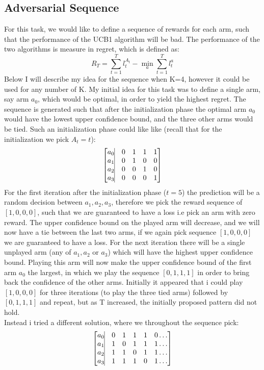 \documentclass{article}
\begin{document}
\subsection{Adversarial Sequence}
For this task, we would like to define a sequence of rewards for each arm, such that the performance of the UCB1 algorithm will be bad. The performance of the two algorithms is measure in regret, which is defined as:
\begin{equation}
R_T = \sum\limits_{t=1}^T l_t^{A_t} - \min_{a} \sum\limits_{t=1}^T l_t^{a}
\end{equation}
Below I will describe my idea for the sequence when K=4, however it could be used for any number of K. My initial idea for this task was to define a single arm, say arm $a_0$, which would be optimal, in order to yield the highest regret. The sequence is generated such that after the initialization phase the optimal arm $a_0$ would have the lowest upper confidence bound, and the three other arms would be tied. Such an initialization phase could like like (recall that for the initialization we pick $A_t = t$):
$$
\begin{bmatrix}
a_0 \vline &  0 & 1 & 1 & 1 \\
a_1\vline & 0 & 1 & 0 & 0 \\
a_2\vline & 0 & 0 & 1 & 0 \\
a_3\vline & 0 & 0 & 0 & 1
\end{bmatrix}
$$
For the first iteration after the initialization phase ($t=5$) the prediction will be a random decision between $a_1,a_2,a_3$, therefore we pick the reward sequence of $[1,0,0,0]$, such that we are guaranteed to have a loss i.e pick an arm with zero reward. The upper confidence  bound on the played arm will decrease, and we will now have a tie between the last two arms, if we again pick sequence $[1,0,0,0]$ we are guaranteed to have a loss. For the next iteration there will be a single unplayed arm (any of $a_1,a_2 \text{ or } a_3$) which will have the highest upper confidence bound. Playing this arm will now make the upper confidence bound of the first arm $a_0$ the largest, in which we play the sequence $[0,1,1,1]$ in order to bring back the confidence of the other arms. Initially it appeared that i could play $[1,0,0,0]$ for three iterations (to play the three tied arms) followed by $[0,1,1,1]$ and repeat, but as T increased, the initially proposed pattern did not hold.  \\
Instead i tried a different solution, where we throughout the sequence pick:
$$
\begin{bmatrix}
a_0 \vline &  0 & 1 & 1 & 1 & 0 \dots \\
a_1\vline  &  1 & 0 & 1 & 1 & 1 \dots \\
a_2\vline  &  1 & 1 & 0 & 1 & 1 \dots \\
a_3\vline  &  1 & 1 & 1 & 0 & 1 \dots
\end{bmatrix}
$$
\end{document}
